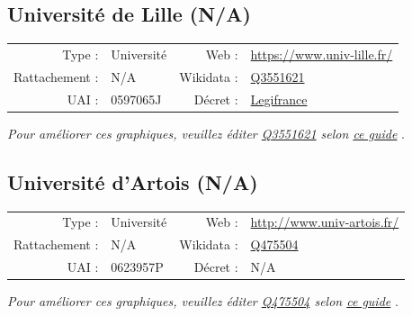 \documentclass[11pt,french,landscape]{article}
\begin{document}

\newpage

\hypertarget{universituxe9-de-lille-na}{%
\subsection{Université de Lille (N/A)}\label{universituxe9-de-lille-na}}

\begin{tabular*}{0.45\textwidth}{rp{2cm}rl}  
\hline  
Type : & Université & Web : &\href{https://www.univ-lille.fr/}{https://www.univ-lille.fr/} \\  
Rattachement : & N/A & Wikidata : & \href{https://www.wikidata.org/entity/Q3551621}{Q3551621} \\  
UAI : & 0597065J & Décret : & \href{https://www.legifrance.gouv.fr/affichTexte.do?cidTexte=JORFTEXT000035543008}{Legifrance} \\  
\hline  
\end{tabular*}

\textit{\scriptsize Pour améliorer ces graphiques, veuillez éditer \href{https://www.wikidata.org/entity/Q3551621}{Q3551621}  selon \href{https://github.com/cpesr/wikidataESR/blob/master/Rmd/wikidataESR.md}{ce guide}}
.


\newpage

\hypertarget{universituxe9-dartois-na}{%
\subsection{Université d'Artois (N/A)}\label{universituxe9-dartois-na}}

\begin{tabular*}{0.45\textwidth}{rp{2cm}rl}  
\hline  
Type : & Université & Web : &\href{http://www.univ-artois.fr/}{http://www.univ-artois.fr/} \\  
Rattachement : & N/A & Wikidata : & \href{https://www.wikidata.org/entity/Q475504}{Q475504} \\  
UAI : & 0623957P & Décret : & N/A \\  
\hline  
\end{tabular*}

\textit{\scriptsize Pour améliorer ces graphiques, veuillez éditer \href{https://www.wikidata.org/entity/Q475504}{Q475504}  selon \href{https://github.com/cpesr/wikidataESR/blob/master/Rmd/wikidataESR.md}{ce guide}}
.
\end{document}
